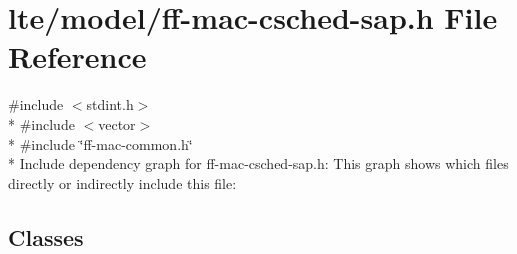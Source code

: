 \hypertarget{ff-mac-csched-sap_8h}{}\section{lte/model/ff-\/mac-\/csched-\/sap.h File Reference}
\label{ff-mac-csched-sap_8h}
{\ttfamily \#include $<$stdint.\+h$>$}\\*
{\ttfamily \#include $<$vector$>$}\\*
{\ttfamily \#include \char`\"{}ff-\/mac-\/common.\+h\char`\"{}}\\*
Include dependency graph for ff-\/mac-\/csched-\/sap.h\+:
This graph shows which files directly or indirectly include this file\+:
\subsection*{Classes}
